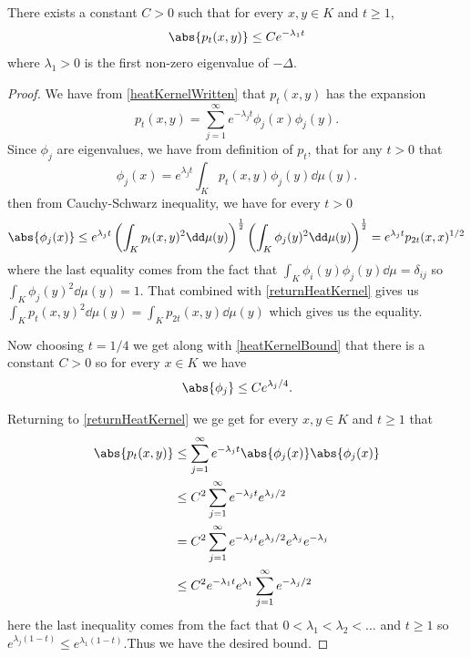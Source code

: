 \begin{lemma}\label{heatKernelBound2}
	There exists a constant $C> 0$ such that for every $x,y \in K$ and $t \geq 1$,
	\begin{equation}
		\abs{p_t(x,y)} \leq Ce^{-\lambda_1 t}
	\end{equation}
	where $\lambda_1 > 0$ is the first non-zero eigenvalue of $-\Delta$.
\end{lemma}
\begin{proof}
	We have from \cref{heatKernelWritten} that $p_t(x,y)$ has the expansion
	\begin{equation}\label{returnHeatKernel}
		p_t(x,y) = \sum_{j = 1}^{\infty} e^{-\lambda_j t}\phi_j(x)\phi_j(y).
	\end{equation}
	Since $\phi_j$ are eigenvalues, we have from definition of $p_t$, that for any $t > 0$ that
	\begin{equation}
		\phi_j(x) = e^{\lambda_jt}\int_{K}p_t(x,y)\phi_j(y) \dd \mu (y).
	\end{equation}
	then from Cauchy-Schwarz inequality, we have for every $t > 0$ 
	\begin{equation}
		\abs{\phi_j(x)} \leq e^{\lambda_j t} \left(\int_{K} p_t(x,y)^{2} \dd \mu (y)\right)^{\frac{1}{2}}\left(\int_{K} \phi_j(y)^{2} \dd \mu (y)\right)^{\frac{1}{2}}  = e^{\lambda_j t}p_{2t}(x,x)^{1/2}
	\end{equation}
	where the last equality comes from the fact that $\int_{K}\phi_i(y)\phi_j(y) \dd \mu = \delta_{ij}$ so $\int_{K} \phi_j(y)^{2} \dd \mu (y) = 1$. That combined with \eqref{returnHeatKernel} gives us $\int_{K} p_t(x,y)^{2} \dd \mu (y) = \int_{K} p_{2t}(x,y) \dd \mu (y)$ which gives us the equality.
	
	Now choosing $t = 1/4$ we get along with \eqref{heatKernelBound} that there is a constant $C > 0$ so for every $x \in K$ we have
	\begin{equation}
		\abs{\phi_j} \leq C e^{\lambda_j/4}.
	\end{equation}
	
	Returning to \eqref{returnHeatKernel} we ge get for every $x, y \in K$ and $t \geq 1$ that
	\begin{align}
		\abs{p_t(x,y)} &\leq \sum_{j = 1}^{\infty} e^{-\lambda_jt} \abs{\phi_j(x)} \abs{\phi_j(x)} \\
		& \leq C^2 \sum_{j = 1}^{\infty} e^{-\lambda_jt} e^{\lambda_j/2} \\
		& = C^2 \sum_{j = 1}^{\infty} e^{-\lambda_jt} e^{\lambda_j/2} e^{\lambda_j}e^{-\lambda_j} \\
		&\leq C^2 e^{-\lambda_1 t}e^{\lambda_1}\sum_{j = 1}^{\infty} e^{-\lambda_j/2}
	\end{align}
	here the last inequality comes from the fact that $0 < \lambda_1 < \lambda_2 < \ldots$ and $t \geq 1$ so $e^{\lambda_j(1-t)} \leq e^{\lambda_1(1-t)}$.Thus we have the desired bound.
\end{proof}

